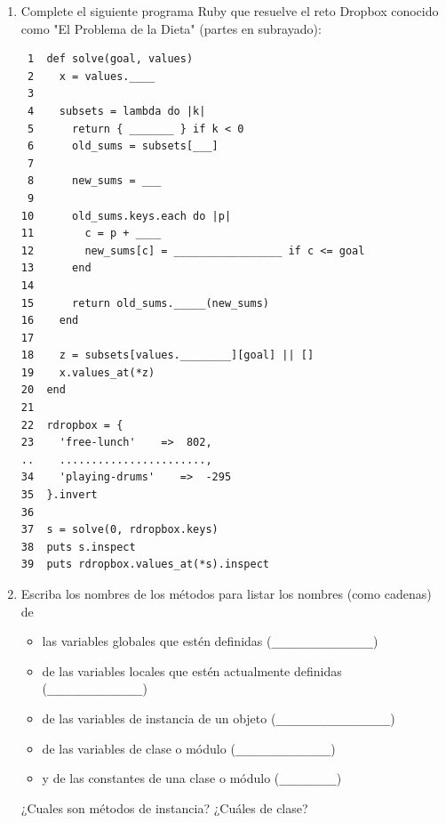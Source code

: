 \begin{enumerate}
\item %
Complete el siguiente programa Ruby que resuelve el reto Dropbox
conocido como "El Problema de la Dieta" (partes en subrayado):
\begin{verbatim}
 1  def solve(goal, values)
 2    x = values.____
 3  
 4    subsets = lambda do |k|
 5      return { _______ } if k < 0
 6      old_sums = subsets[___]
 7  
 8      new_sums = ___
 9  
10      old_sums.keys.each do |p|
11        c = p + ____
12        new_sums[c] = _________________ if c <= goal
13      end
14  
15      return old_sums._____(new_sums) 
16    end
17  
18    z = subsets[values.________][goal] || []
19    x.values_at(*z)
20  end
21  
22  rdropbox = {
23    'free-lunch'    =>  802,
..    .......................,
34    'playing-drums'    =>  -295
35  }.invert
36  
37  s = solve(0, rdropbox.keys)
38  puts s.inspect
39  puts rdropbox.values_at(*s).inspect
\end{verbatim}
\item
Escriba los nombres de los métodos para listar los nombres (como cadenas)
de 
\begin{itemize}
\item las variables globales que estén definidas (\verb|________________|) 
\item de las variables locales que estén actualmente definidas (\verb|_______________|)
\item de las variables de instancia de un objeto (\verb|__________________|)
\item de las variables de clase o módulo (\verb|_______________|)
\item y de las constantes de una clase o módulo (\verb|_________|)
\end{itemize}
¿Cuales son métodos de instancia? ¿Cuáles de clase?


\end{enumerate}
